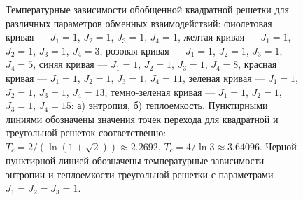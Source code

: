 \documentclass[utf8,12pt]{jetp}
\begin{document}
\begin{figure}[h]
	\begin{minipage}[h]{0.5\linewidth}
	\end{minipage}
	\hfill
	\begin{minipage}[h]{0.5\linewidth}
	\end{minipage}
	\caption{Температурные зависимости обобщенной квадратной решетки для различных параметров обменных взаимодействий: фиолетовая кривая --- $J_1 = 1$, $J_2 = 1$, $J_3 = 1$, $J_4 = 1$, желтая кривая --- $J_1 = 1$, $J_2 = 1$, $J_3 = 1$, $J_4 = 3$, розовая кривая --- $J_1 = 1$, $J_2 = 1$, $J_3 = 1$, $J_4 = 5$, синяя кривая --- $J_1 = 1$, $J_2 = 1$, $J_3 = 1$, $J_4 = 8$, красная кривая --- $J_1 = 1$, $J_2 = 1$, $J_3 = 1$, $J_4 = 11$, зеленая кривая --- $J_1 = 1$, $J_2 = 1$, $J_3 = 1$, $J_4 = 13$, темно-зеленая кривая --- $J_1 = 1$, $J_2 = 1$, $J_3 = 1$, $J_4 = 15$: а) энтропия, б) теплоемкость. Пунктирными линиями обозначены значения точек перехода для квадратной и треугольной решеток соответственно: $T_c = 2/(\ln(1+\sqrt{2}))\approx 2.2692$,  $T_c = 4/\ln 3\approx 3.64096$. Черной пунктирной линией обозначены температурные зависимости энтропии и теплоемкости треугольной решетки с параметрами $J_1 = J_2 = J_3 = 1$.}
	\label{Triangular}
\end{figure}
\end{document}

